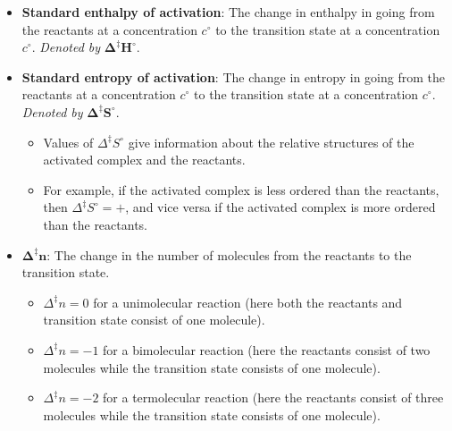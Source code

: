 \documentclass[../notes.tex]{subfiles}
\begin{document}
\begin{itemize}
    \item \textbf{Standard enthalpy of activation}: The change in enthalpy in going from the reactants at a concentration $c^\circ$ to the transition state at a concentration $c^\circ$. \emph{Denoted by} $\bm{\Delta^\ddagger H^\circ}$.
    \item \textbf{Standard entropy of activation}: The change in entropy in going from the reactants at a concentration $c^\circ$ to the transition state at a concentration $c^\circ$. \emph{Denoted by} $\bm{\Delta^\ddagger S^\circ}$.
    \begin{itemize}
        \item Values of $\Delta^\ddagger S^\circ$ give information about the relative structures of the activated complex and the reactants.
        \item For example, if the activated complex is less ordered than the reactants, then $\Delta^\ddagger S^\circ=+$, and vice versa if the activated complex is more ordered than the reactants.
    \end{itemize}
    \item $\bm{\Delta^\ddagger n}$: The change in the number of molecules from the reactants to the transition state.
    \begin{itemize}
        \item $\Delta^\ddagger n=0$ for a unimolecular reaction (here both the reactants and transition state consist of one molecule).
        \item $\Delta^\ddagger n=-1$ for a bimolecular reaction (here the reactants consist of two molecules while the transition state consists of one molecule).
        \item $\Delta^\ddagger n=-2$ for a termolecular reaction (here the reactants consist of three molecules while the transition state consists of one molecule).
    \end{itemize}
\end{itemize}
\end{document}
